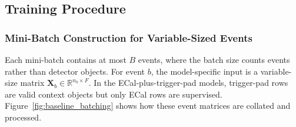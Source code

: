 

\subsection{Training Procedure}



\subsubsection{Mini-Batch Construction for Variable-Sized Events}
\label{sec:method_batching}

Each mini-batch contains at most \(B\) events, where the batch size counts
events rather than detector objects. For event \(b\), the model-specific input
is a variable-size matrix
\(\mathbf{X}_b\in\mathbb{R}^{n_b\times F}\). 
In the ECal-plus-trigger-pad models, trigger-pad rows are valid
context objects but only ECal rows are supervised. Figure~\ref{fig:baseline_batching}
shows how these event matrices are collated and processed.

